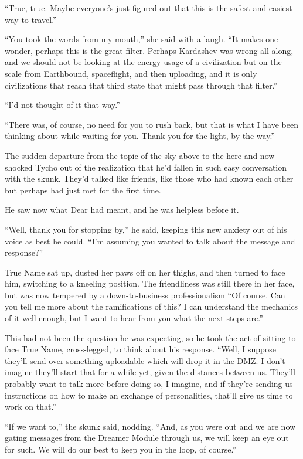 ``True, true. Maybe everyone's just figured out that this is the safest and easiest way to travel.''

``You took the words from my mouth,'' she said with a laugh. ``It makes one wonder, perhaps this is the great filter. Perhaps Kardashev was wrong all along, and we should not be looking at the energy usage of a civilization but on the scale from Earthbound, spaceflight, and then uploading, and it is only civilizations that reach that third state that might pass through that filter.''

``I'd not thought of it that way.''

``There was, of course, no need for you to rush back, but that is what I have been thinking about while waiting for you. Thank you for the light, by the way.''

The sudden departure from the topic of the sky above to the here and now shocked Tycho out of the realization that he'd fallen in such easy conversation with the skunk. They'd talked like friends, like those who had known each other but perhaps had just met for the first time.

He saw now what Dear had meant, and he was helpless before it.

``Well, thank you for stopping by,'' he said, keeping this new anxiety out of his voice as best he could. ``I'm assuming you wanted to talk about the message and response?''

True Name sat up, dusted her paws off on her thighs, and then turned to face him, switching to a kneeling position. The friendliness was still there in her face, but was now tempered by a down-to-business professionalism ``Of course. Can you tell me more about the ramifications of this? I can understand the mechanics of it well enough, but I want to hear from you what the next steps are.''

This had not been the question he was expecting, so he took the act of sitting to face True Name, cross-legged, to think about his response. ``Well, I suppose they'll send over something uploadable which will drop it in the DMZ. I don't imagine they'll start that for a while yet, given the distances between us. They'll probably want to talk more before doing so, I imagine, and if they're sending us instructions on how to make an exchange of personalities, that'll give us time to work on that.''

``If we want to,'' the skunk said, nodding. ``And, as you were out and we are now gating messages from the Dreamer Module through us, we will keep an eye out for such. We will do our best to keep you in the loop, of course.''

